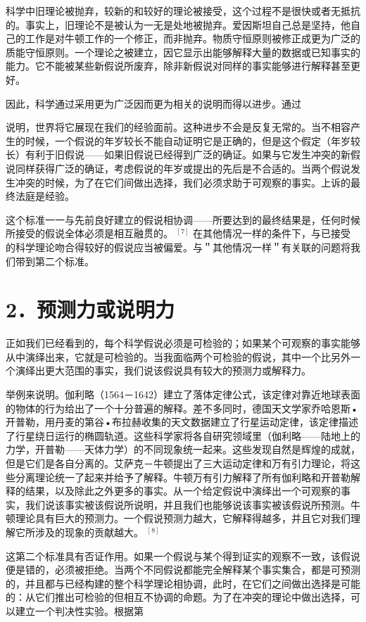 科学中旧理论被抛弃，较新的和较好的理论被接受，这个过程不是很快或者无抵抗的。事实上，旧理论不是被认为一无是处地被抛弃。爱因斯坦自己总是坚持，他自己的工作是对牛顿工作的一个修正，而非抛弃。物质守恒原则被修正成更为广泛的质能守恒原则。一个理论之被建立，因它显示出能够解释大量的数据或已知事实的能力。它不能被某些新假说所废弃，除非新假说对同样的事实能够进行解释甚至更好。

因此，科学通过采用更为广泛因而更为相关的说明而得以进步。通过

说明，世界将它展现在我们的经验面前。这种进步不会是反复无常的。当不相容产生的时候，一个假说的年岁较长不能自动证明它是正确的，但是这个假定（年岁较长）有利于旧假说——如果旧假说已经得到广泛的确证。如果与它发生冲突的新假说同样获得广泛的确证，考虑假说的年岁或提出的先后是不合适的。当两个假说发生冲突的时候，为了在它们间做出选择，我们必须求助于可观察的事实。上诉的最终法庭是经验。

这个标准一一与先前良好建立的假说相协调——所要达到的最终结果是，任何时候所接受的假说全体必须是相互融贯的。 ${ }^{[7]}$ 在其他情况一样的条件下，与已接受的科学理论吻合得较好的假说应当被偏爱。与＂其他情况一样＂有关联的问题将我们带到第二个标准。

\section*{2．预测力或说明力}
正如我们已经看到的，每个科学假说必须是可检验的；如果某个可观察的事实能够从中演绎出来，它就是可检验的。当我面临两个可检验的假说，其中一个比另外一个演绎出更大范围的事实，我们说该假说具有较大的预测力或解释力。

举例来说明。伽利略（1564－1642）建立了落体定律公式，该定律对靠近地球表面的物体的行为给出了一个十分普遍的解释。差不多同时，德国天文学家乔哈恩斯•开普勒，用丹麦的第谷•布拉赫收集的天文数据建立了行星运动定律，该定律描述了行星绕日运行的椭圆轨道。这些科学家将各自研究领域里（伽利略——陆地上的力学，开普勒——天体力学）的不同现象统一起来。这些发现自然是辉煌的成就，但是它们是各自分离的。艾萨克－牛顿提出了三大运动定律和万有引力理论，将这些分离理论统一了起来并给予了解释。牛顿万有引力解释了所有伽利略和开普勒解释的结果，以及除此之外更多的事实。从一个给定假说中演绎出一个可观察的事实，我们说该事实被该假说所说明，并且我们也能够说该事实被该假说所预测。牛顿理论具有巨大的预测力。一个假说预测力越大，它解释得越多，并且它对我们理解它所涉及的现象的贡献越大。 ${ }^{[8]}$

这第二个标准具有否证作用。如果一个假说与某个得到证实的观察不一致，该假说便是错的，必须被拒绝。当两个不同假说都能完全解释某个事实集合，都是可预测的，并且都与已经构建的整个科学理论相协调，此时，在它们之间做出选择是可能的：从它们推出可检验的但相互不协调的命题。为了在冲突的理论中做出选择，可以建立一个判决性实验。根据第

